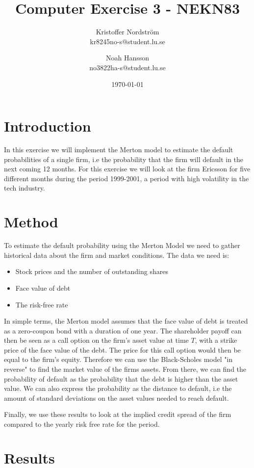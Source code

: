 \documentclass[a4paper]{article}
\title{Computer Exercise 3 - NEKN83}
\author{Kristoffer Nordström \\ kr8245no-s@student.lu.se \and  Noah Hansson \\ no3822ha-s@student.lu.se}
\date{\today}
\begin{document}
\maketitle

\section{Introduction}
In this exercise we will implement the Merton model to estimate the default probabilities of a single firm, i.e the probability that the firm will default in the next coming 12 months. For this exercise we will look at the firm Ericsson for five different months during the period 1999-2001, a period with high volatility in the tech industry.

\section{Method}
To estimate the default probability using the Merton Model we need to gather historical data about the firm and market conditions. The data we need is:
\begin{itemize}
    \item Stock prices and the number of outstanding shares
    \item Face value of debt
    \item The risk-free rate
\end{itemize}

In simple terms, the Merton model assumes that the face value of debt is treated as a zero-coupon bond with a duration of one year. The shareholder payoff can then be seen as a call option on the firm's asset value at time $T$, with a strike price of the face value of the debt. The price for this call option would then be equal to the firm's equity. Therefore we can use the Black-Scholes model "in reverse" to find the market value of the firms assets. From there, we can find the probability of default as the probability that the debt is higher than the asset value. We can also express the probability as the distance to default, i.e the amount of standard deviations on the asset values needed to reach default.

Finally, we use these results to look at the implied credit spread of the firm compared to the yearly risk free rate for the period. 

\section{Results}
\end{document}
